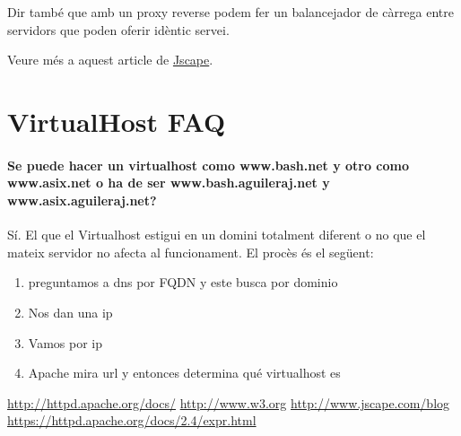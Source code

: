 \documentclass[a4paper, 11pt]{article}
\begin{document}
Dir tamb\'e que amb un proxy reverse podem fer un balancejador de càrrega entre servidors que poden oferir idèntic servei.

Veure m\'es a aquest article de \href{http://www.jscape.com/blog/bid/87783/Forward-Proxy-vs-Reverse-Proxy}{Jscape}\cite{Jscape}.

\section{VirtualHost FAQ}
\paragraph{Se puede hacer un virtualhost como www.bash.net y otro como www.asix.net o ha de ser www.bash.aguileraj.net y www.asix.aguileraj.net?}
Sí. El que el Virtualhost estigui en un domini totalment diferent o no que el mateix servidor no afecta al funcionament. El procès \'es el següent:
\begin{enumerate}
	\item preguntamos a dns por FQDN y este busca por dominio
	\item Nos dan una ip
  \item Vamos por ip
	\item Apache mira url y entonces determina qu\'e  virtualhost es
\end{enumerate}

\begin{thebibliography}{99}
	 \url{http://httpd.apache.org/docs/}
	 \url{http://www.w3.org}
	 \url{http://www.jscape.com/blog}
	 \url{https://httpd.apache.org/docs/2.4/expr.html}
\end{thebibliography}
\end{document}
